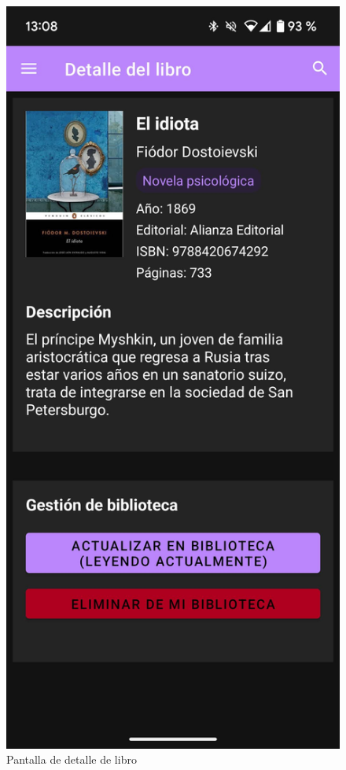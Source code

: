 \documentclass[a4paper,12pt]{report}
\begin{document}
\begin{multicols}{2}
        \begin{figure}[H]
          \centering
          \includegraphics[width=0.95\linewidth]{.img/libro.png}
          \caption{Pantalla de detalle de libro}
        \end{figure}
        

\end{multicols}
\end{document}
